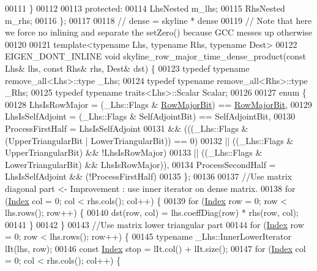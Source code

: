 \begin{DoxyCode}
00111     \}
00112 
00113 \textcolor{keyword}{protected}:
00114     LhsNested m\_lhs;
00115     RhsNested m\_rhs;
00116 \};
00117 
00118 \textcolor{comment}{// dense = skyline * dense}
00119 \textcolor{comment}{// Note that here we force no inlining and separate the setZero() because GCC messes up otherwise}
00120 
00121 \textcolor{keyword}{template}<\textcolor{keyword}{typename} Lhs, \textcolor{keyword}{typename} Rhs, \textcolor{keyword}{typename} Dest>
00122 EIGEN\_DONT\_INLINE \textcolor{keywordtype}{void} skyline\_row\_major\_time\_dense\_product(\textcolor{keyword}{const} Lhs& lhs, \textcolor{keyword}{const} Rhs& rhs, Dest& dst) \{
00123     \textcolor{keyword}{typedef} \textcolor{keyword}{typename} remove\_all<Lhs>::type \_Lhs;
00124     \textcolor{keyword}{typedef} \textcolor{keyword}{typename} remove\_all<Rhs>::type \_Rhs;
00125     \textcolor{keyword}{typedef} \textcolor{keyword}{typename} traits<Lhs>::Scalar Scalar;
00126 
00127     \textcolor{keyword}{enum} \{
00128         LhsIsRowMajor = (\_Lhs::Flags & \hyperlink{group__flags_gae4f56c2a60bbe4bd2e44c5b19cbe8762}{RowMajorBit}) == \hyperlink{group__flags_gae4f56c2a60bbe4bd2e44c5b19cbe8762}{RowMajorBit},
00129         LhsIsSelfAdjoint = (\_Lhs::Flags & SelfAdjointBit) == SelfAdjointBit,
00130         ProcessFirstHalf = LhsIsSelfAdjoint
00131         && (((\_Lhs::Flags & (UpperTriangularBit | LowerTriangularBit)) == 0)
00132         || ((\_Lhs::Flags & UpperTriangularBit) && !LhsIsRowMajor)
00133         || ((\_Lhs::Flags & LowerTriangularBit) && LhsIsRowMajor)),
00134         ProcessSecondHalf = LhsIsSelfAdjoint && (!ProcessFirstHalf)
00135     \};
00136 
00137     \textcolor{comment}{//Use matrix diagonal part <- Improvement : use inner iterator on dense matrix.}
00138     \textcolor{keywordflow}{for} (\hyperlink{namespace_eigen_a62e77e0933482dafde8fe197d9a2cfde}{Index} col = 0; col < rhs.cols(); col++) \{
00139         \textcolor{keywordflow}{for} (\hyperlink{namespace_eigen_a62e77e0933482dafde8fe197d9a2cfde}{Index} row = 0; row < lhs.rows(); row++) \{
00140             dst(row, col) = lhs.coeffDiag(row) * rhs(row, col);
00141         \}
00142     \}
00143     \textcolor{comment}{//Use matrix lower triangular part}
00144     \textcolor{keywordflow}{for} (\hyperlink{namespace_eigen_a62e77e0933482dafde8fe197d9a2cfde}{Index} row = 0; row < lhs.rows(); row++) \{
00145         \textcolor{keyword}{typename} \_Lhs::InnerLowerIterator lIt(lhs, row);
00146         \textcolor{keyword}{const} \hyperlink{namespace_eigen_a62e77e0933482dafde8fe197d9a2cfde}{Index} stop = lIt.col() + lIt.size();
00147         \textcolor{keywordflow}{for} (\hyperlink{namespace_eigen_a62e77e0933482dafde8fe197d9a2cfde}{Index} col = 0; col < rhs.cols(); col++) \{

\end{DoxyCode}

